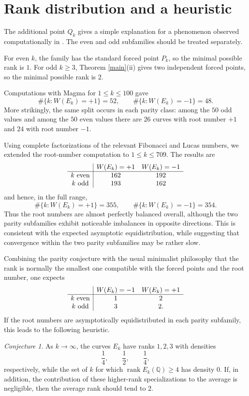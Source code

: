 \documentclass[11pt]{amsart}
\theoremstyle{remark}
\newtheorem{conjecture}[theorem]{Conjecture}
\newcommand{\Q}{\mathbb{Q}}
\begin{document}
\section{Rank distribution and a heuristic}

The additional point $Q_k$ gives a simple explanation for a phenomenon
observed computationally in \cite[Remark 4.9.5]{DujellaBook}.
The even and odd subfamilies should be treated separately.

For even $k$, the family has the standard forced point $P_k$, so the
minimal possible rank is $1$.  For odd $k\geq3$, Theorem
\ref{main}(ii) gives two independent forced points, so the minimal
possible rank is $2$.

Computations with Magma for $1\leq k\leq100$ gave
\[
 \#\{k:W(E_k)=+1\}=52,\qquad
 \#\{k:W(E_k)=-1\}=48.
\]
More strikingly, the same split occurs in each parity class:
among the $50$ odd values and among the $50$ even values there are
$26$ curves with root number $+1$ and $24$ with root number $-1$.

Using complete factorizations of the relevant Fibonacci and Lucas numbers, 
we extended the root-number computation to $1\le k\le 709$. The results are
$$
\begin{array}{c|cc}
 & W(E_k)=+1 & W(E_k)=-1\\ \hline
 k\ {\rm even} & 162 & 192\\
 k\ {\rm odd}  & 193 & 162
\end{array}
$$
and hence, in the full range,
$$
\#\{k:W(E_k)=+1\}=355,\qquad
\#\{k:W(E_k)=-1\}=354.
$$
Thus the root numbers are almost perfectly balanced overall, although the
two parity subfamilies exhibit noticeable imbalances in opposite directions.
This is consistent with the expected asymptotic equidistribution, while
suggesting that convergence within the two parity subfamilies may be rather slow.

Combining the parity conjecture with the usual minimalist
philosophy that the rank is normally the smallest one compatible with
the forced points and the root number, one expects
\[
\begin{array}{c|cc}
 & W(E_k)=-1 & W(E_k)=+1\\ \hline
 k\ {\rm even}&1&2\\
 k\ {\rm odd}&3&2.
\end{array}
\]
If the root numbers are asymptotically equidistributed in each parity
subfamily, this leads to the following heuristic.

\begin{conjecture}\label{rankheuristic}
As $k\to\infty$, the curves $E_k$ have ranks $1,2,3$ with densities
\[
 \frac14,\qquad\frac12,\qquad\frac14,
\]
respectively, while the set of $k$ for which
$\operatorname{rank}E_k(\Q)\geq4$ has density $0$.
If, in addition, the contribution of these higher-rank specializations
to the average is negligible, then the average rank should tend to $2$.
\end{conjecture}
\end{document}
